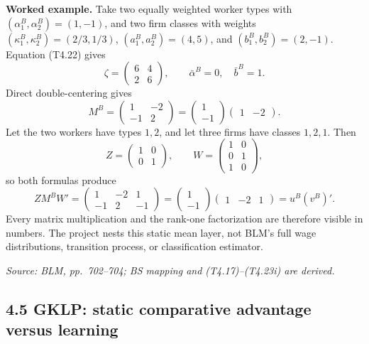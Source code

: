 \documentclass[11pt]{article}
\begin{document}
\textbf{Worked example.}
Take two equally weighted worker types with
\((\alpha_1^B,\alpha_2^B)=(1,-1)\), and two firm classes with weights
\((\kappa_1^B,\kappa_2^B)=(2/3,1/3)\),
\((a_1^B,a_2^B)=(4,5)\), and
\((b_1^B,b_2^B)=(2,-1)\).  Equation (T4.22) gives
\[
\zeta=
\begin{pmatrix}6&4\\2&6\end{pmatrix},
\qquad
\bar\alpha^B=0,\quad \bar b^B=1.
\tag{T4.23f}
\]
Direct double-centering gives
\[
M^B=
\begin{pmatrix}1&-2\\-1&2\end{pmatrix}
=
\begin{pmatrix}1\\-1\end{pmatrix}
\begin{pmatrix}1&-2\end{pmatrix}.
\tag{T4.23g}
\]
Let the two workers have types \(1,2\), and let three firms have classes
\(1,2,1\).  Then
\[
Z=\begin{pmatrix}1&0\\0&1\end{pmatrix},
\qquad
W=\begin{pmatrix}1&0\\0&1\\1&0\end{pmatrix},
\tag{T4.23h}
\]
so both formulas produce
\[
ZM^BW'
=
\begin{pmatrix}1&-2&1\\-1&2&-1\end{pmatrix}
=
\begin{pmatrix}1\\-1\end{pmatrix}
\begin{pmatrix}1&-2&1\end{pmatrix}
=u^B(v^B)'.
\tag{T4.23i}
\]
Every matrix multiplication and the rank-one factorization are therefore
visible in numbers.  The project nests this static mean layer, not BLM's full
wage distributions, transition process, or classification estimator.

\textit{Source: BLM, pp.\ 702--704; BS mapping and
(T4.17)--(T4.23i) are derived.}

\subsection{4.5 GKLP: static comparative advantage versus learning}
\end{document}
